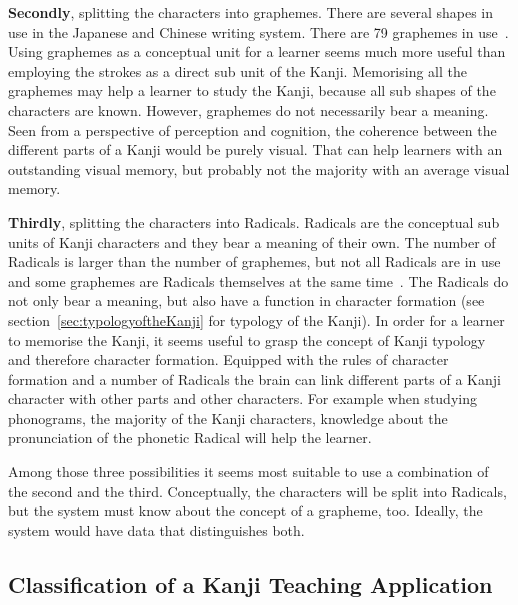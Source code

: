 \textbf{Secondly}, splitting the characters into graphemes. There are several 
shapes in use in the Japanese and Chinese writing system. There are 79 
graphemes in use~.
Using graphemes as a conceptual unit for a learner seems much more useful than
employing the strokes as a direct sub unit of the Kanji.
Memorising all the graphemes may help a learner to study the Kanji, because all 
sub shapes of the characters are known. However, graphemes do not necessarily 
bear a meaning. Seen from a perspective of perception and cognition, 
the coherence between the different parts of a Kanji would be purely visual.
That can help learners with an outstanding visual memory, but probably not
the majority with an average visual memory.

\textbf{Thirdly}, splitting the characters into Radicals. Radicals are the 
conceptual sub units of Kanji characters and they bear a meaning of their 
own. The number of Radicals is larger than the number of graphemes, but not all 
Radicals are in use and some graphemes are Radicals themselves at the same 
time~.
The Radicals do not only bear a meaning, but also have a function in character
formation (see section~\ref{sec:typologyoftheKanji} for typology of the Kanji).
In order for a learner to memorise the Kanji, it seems useful to grasp the 
concept of Kanji typology and therefore character formation.
Equipped with the rules of character formation and a number of Radicals the
brain can link different parts of a Kanji character with other parts and 
other characters. For example when studying phonograms, the majority of the
Kanji characters, knowledge about the pronunciation of the phonetic Radical
will help the learner.

Among those three possibilities it seems most suitable to use a combination of 
the second and the third. Conceptually, the characters will be split into 
Radicals, but the system must know about the concept of a grapheme, too.
Ideally, the system would have data that distinguishes both.

\subsection{Classification of a Kanji Teaching Application}
\label{sec:concept:classificationofaKanjiteachingapplication}

